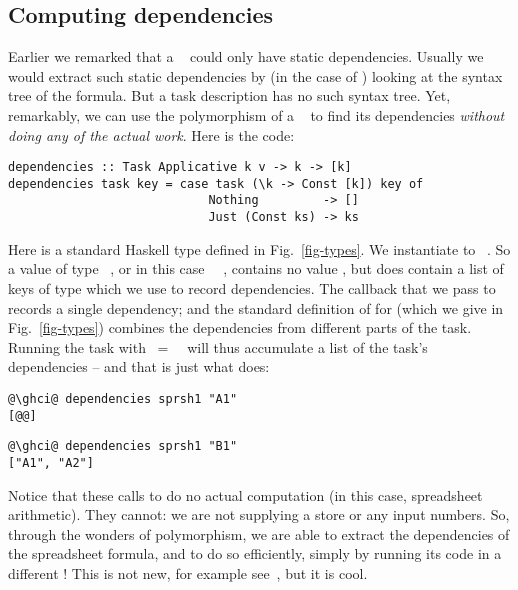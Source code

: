 \subsection{Computing dependencies}\label{sec-deps}\label{secdeps} %

Earlier we remarked that a ~ could only have static
dependencies. Usually we would extract such static dependencies by (in the case
of \Excel) looking at the syntax tree of the formula.  But a task description
has no such syntax tree. Yet, remarkably, we can use the polymorphism of a
~ to find its dependencies \emph{without doing any of
the actual work}. Here is the code:
\vspace{1mm}
\begin{verbatim}
dependencies :: Task Applicative k v -> k -> [k]
dependencies task key = case task (\k -> Const [k]) key of
                            Nothing         -> []
                            Just (Const ks) -> ks
\end{verbatim}
\vspace{1mm}
Here  is a standard Haskell type defined in Fig.~\ref{fig-types}. We
instantiate  to ~\hs{[@@k]}.  So a value of type ~,
or in this case ~\hs{[@@k]}~, contains no value , but does
contain a list of keys of type \hs{[@@k]} which we use to record dependencies.
The  callback that we pass to  records a single dependency;
and the standard definition of  for  (which we give
in Fig.~\ref{fig-types}) combines the dependencies from different parts of the
task. Running the task with ~=~~\hs{[@@k]} will thus
accumulate a list of the task's dependencies -- and that is just what
 does:
\vspace{1mm}
\begin{verbatim}
@\ghci@ dependencies sprsh1 "A1"
[@@]
\end{verbatim}
\begin{verbatim}
@\ghci@ dependencies sprsh1 "B1"
["A1", "A2"]
\end{verbatim}
\vspace{1mm}

\noindent
Notice that these calls to  do no actual computation (in this
case, spreadsheet arithmetic). They cannot: we are not supplying a store or any
input numbers. So, through the wonders of polymorphism, we are able to extract
the dependencies of the spreadsheet formula, and to do so efficiently, simply by
running its code in a different ! This is not new, for example
see~\cite{free-applicatives}, but it is cool.

